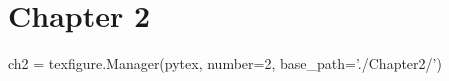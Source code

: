 
\chapter{Chapter 2}\label{ch:2}  %

\begin{pycode}[chapter2]
ch2 = texfigure.Manager(pytex, number=2, base_path='./Chapter2/')
\end{pycode}
